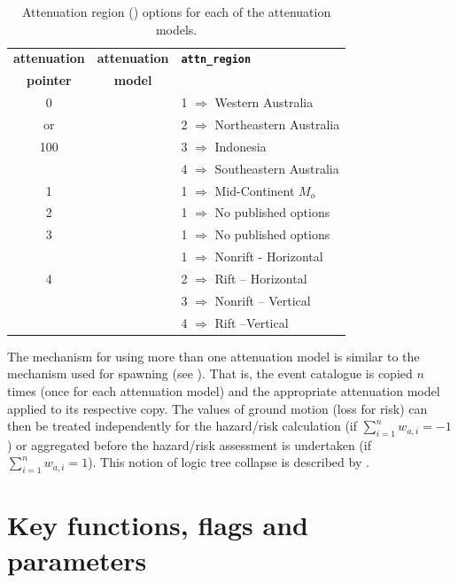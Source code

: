 \begin{table}
\caption{Attenuation region ()
options for each of the attenuation models.} \vspace{0.8em}
\label{tab:attn-regions}
\begin{center}
\begin{tabular}{|c|c|l|}
\hline \textbf{attenuation} & \textbf{attenuation} & \textbf{\texttt{attn\_region}} \\
\textbf{pointer} & \textbf{model} & \textbf{} \\
\hline
0   &  & 1 $\Rightarrow$ Western Australia  \\
or & \cite{dr_Gaull90a} & 2 $\Rightarrow$ Northeastern Australia\\
100 & & 3 $\Rightarrow$ Indonesia\\
 & & 4 $\Rightarrow$ Southeastern Australia\\
\hline
1 & \cite{dr_Toro97a} & 1 $\Rightarrow$ Mid-Continent $M_o$ \\
\hline
2 & \cite{dr_Atkinson97a} & 1 $\Rightarrow$ No published options \\
\hline
3 & \cite{dr_Sadigh97a} & 1 $\Rightarrow$ No published options \\
\hline
 &  & 1 $\Rightarrow$ Nonrift - Horizontal\\
4 & \cite{dr_Somerville01a} & 2 $\Rightarrow$ Rift -- Horizontal\\
 & & 3 $\Rightarrow$ Nonrift -- Vertical\\
 & & 4 $\Rightarrow$ Rift --Vertical\\
\hline
\end{tabular}
\end{center}
\end{table}

The mechanism for using more than one attenuation model is similar
to the mechanism used for spawning (see
). That is, the event catalogue is
copied $n$ times (once for each attenuation model) and the
appropriate attenuation model applied to its respective copy. The
values of ground motion (loss for risk) can then be treated
independently for the hazard/risk calculation (if
$\sum_{i=1}^{n}w_{a,i} = -1$) or aggregated before the hazard/risk
assessment is undertaken (if $\sum_{i=1}^{n}w_{a,i} = 1$). This
notion of logic tree collapse is described by
.

\clearpage
\newpage
\section{Key functions, flags and parameters}

